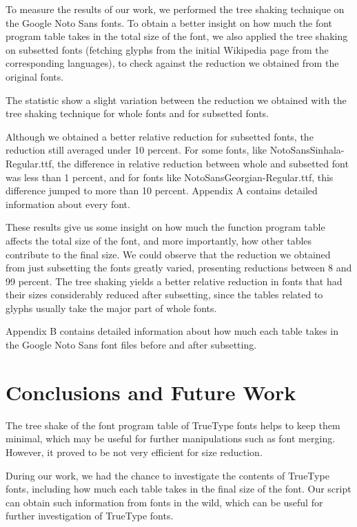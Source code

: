 \documentclass[12pt]{article}
\begin{document}
To measure the results of our work, we performed the tree shaking
technique on the Google Noto Sans fonts\cite{notosans}. To obtain a
better insight on how much the font program table takes in the total
size of the font, we also applied the tree shaking on subsetted fonts
(fetching glyphs from the initial Wikipedia page from the corresponding
languages), to check against the reduction we obtained from the original
fonts.



The statistic show a slight variation between the reduction we obtained
with the tree shaking technique for whole fonts and for subsetted fonts.

Although we obtained a better relative reduction for subsetted fonts, the
reduction still averaged under 10 percent. For some fonts, like
NotoSansSinhala-Regular.ttf, the difference in relative reduction
between whole and subsetted font was less than 1 percent, and for fonts
like NotoSansGeorgian-Regular.ttf, this difference jumped to more than
10 percent. Appendix A contains detailed information about every font.

These results give us some insight on how much the function program
table affects the total size of the font, and more importantly, how
other tables contribute to the final size. We could observe that the
reduction we obtained from just subsetting the fonts greatly
varied, presenting reductions between 8 and 99 percent. The tree shaking
yields a better relative reduction in fonts that had their sizes
considerably reduced after subsetting, since the tables related to
glyphs usually take the major part of whole fonts.

Appendix B contains detailed information about how much each table takes
in the Google Noto Sans font files before and after subsetting.

\section{Conclusions and Future Work}

The tree shake of the font program table of TrueType fonts helps to keep
them minimal, which may be useful for further manipulations such as
font merging. However, it proved to be not very efficient for size
reduction.

During our work, we had the chance to investigate the contents
of TrueType fonts, including how much each table takes in the final size
of the font. Our script can obtain such information from fonts in the
wild, which can be useful for further investigation of TrueType fonts.
\end{document}
